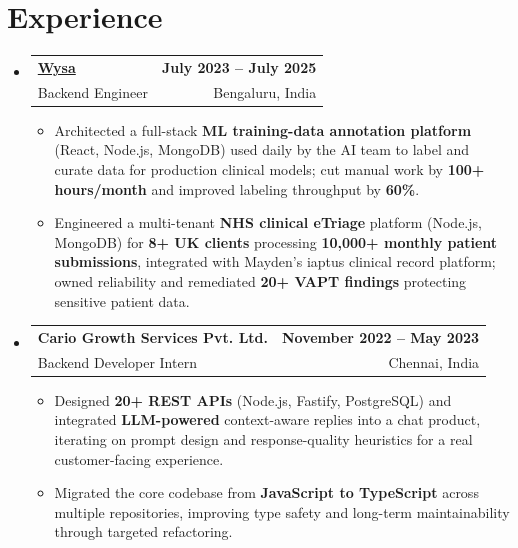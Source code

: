 \documentclass[letterpaper,10pt]{article}
\makeatletter
\newcommand{\resumeItem}[1]{
  \item\small{#1\vspace{-1pt}}
}
\newcommand{\resumeSubheading}[4]{
  \vspace{1pt}\item
    \begin{tabular*}{0.985\textwidth}[t]{l@{\extracolsep{\fill}}r}
      \textbf{#1} & \textbf{\small #2} \\
      {\small\color{ResumeSlate} #3} & {\small\color{ResumeSlate} #4} \\
    \end{tabular*}\vspace{-6pt}
}
\newcommand{\resumeSubHeadingListStart}{\begin{itemize}[leftmargin=0.0in, label={}, itemsep=2pt, topsep=2pt]}
\newcommand{\resumeSubHeadingListEnd}{\end{itemize}}
\newcommand{\resumeItemListStart}{\begin{itemize}[leftmargin=0.18in, itemsep=2pt, topsep=1pt]}
\newcommand{\resumeItemListEnd}{\end{itemize}\vspace{-4pt}}
\makeatother
\begin{document}
\section{Experience}
\resumeSubHeadingListStart
  \resumeSubheading
    {\href{https://www.wysa.io}{Wysa}}{July 2023 -- July 2025}
    {Backend Engineer}{Bengaluru, India}
    \resumeItemListStart
      \resumeItem{Architected a full-stack \textbf{ML training-data annotation platform} (React, Node.js, MongoDB) used daily by the AI team to label and curate data for production clinical models; cut manual work by \textbf{100+ hours/month} and improved labeling throughput by \textbf{60\%}.}
      \resumeItem{Engineered a multi-tenant \textbf{NHS clinical eTriage} platform (Node.js, MongoDB) for \textbf{8+ UK clients} processing \textbf{10{,}000+ monthly patient submissions}, integrated with Mayden's iaptus clinical record platform; owned reliability and remediated \textbf{20+ VAPT findings} protecting sensitive patient data.}
    \resumeItemListEnd
  \resumeSubheading
    {Cario Growth Services Pvt. Ltd.}{November 2022 -- May 2023}
    {Backend Developer Intern}{Chennai, India}
    \resumeItemListStart
      \resumeItem{Designed \textbf{20+ REST APIs} (Node.js, Fastify, PostgreSQL) and integrated \textbf{LLM-powered} context-aware replies into a chat product, iterating on prompt design and response-quality heuristics for a real customer-facing experience.}
      \resumeItem{Migrated the core codebase from \textbf{JavaScript to TypeScript} across multiple repositories, improving type safety and long-term maintainability through targeted refactoring.}
    \resumeItemListEnd
\resumeSubHeadingListEnd
\vspace{-4pt}
\end{document}
